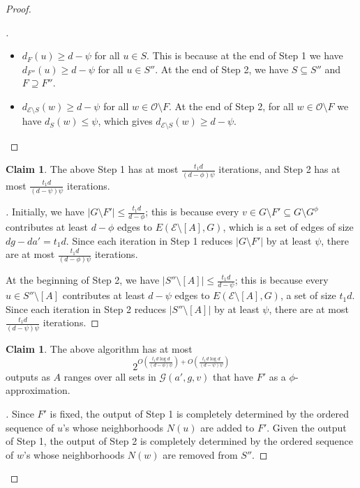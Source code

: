 \documentclass{amsart}
\newenvironment{subproof}[1][\proofname]{
  \renewcommand{\qedsymbol}{$\blacksquare$}
  \begin{proof}[#1]
}{
  \end{proof}
}
\theoremstyle{definition}
\newtheorem{claim}[thm]{Claim}
\newcommand{\cO}{\mathcal{O} }
\newcommand{\cE}{\mathcal{E} }
\newcommand{\cG}{\mathcal{G} }
\newcommand{\0}[0]{\emptyset}
\begin{document}
\begin{proof}
\begin{subproof}
\begin{itemize}
        \item $d_F(u)\geq d-\psi$ for all $u\in S$. This is because at the end of Step 1 we have $d_{F''}(u)\geq d-\psi$ for all $u\in S''$. At the end of Step 2, we have $S\subseteq S''$ and $F\supseteq F''$.
        
        \item $d_{\cE\setminus S}(w)\geq d-\psi$ for all $w\in \cO\setminus F$. At the end of Step 2, for all $w\in \cO\setminus F$ we have $d_{S}(w)\leq \psi$, which gives $d_{\cE\setminus S}(w)\geq d-\psi$. \qedhere
    \end{itemize}
\end{subproof}

\begin{claim}\label{claim:psi-iterations-bound}
    The above Step 1 has at most $\frac{t_1d}{(d-\phi)\psi}$ iterations, and Step 2 has at most $\frac{t_1d}{(d-\psi)\psi}$ iterations.
\end{claim}
\begin{subproof}
    Initially, we have $|G\setminus F'|\leq \frac{t_1d}{d-\phi}$; this is because every $v\in G\setminus F'\subseteq G\setminus G^\phi$ contributes at least $d-\phi$ edges to $E(\cE\setminus [A], G)$, which is a set of edges of size $dg-da'=t_1d$. Since each iteration in Step 1 reduces $|G\setminus F'|$ by at least $\psi$, there are at most $\frac{t_1d}{(d-\phi)\psi}$ iterations.

    At the beginning of Step 2, we have $|S''\setminus [A]|\leq\frac{t_1d}{d-\psi}$; this is because every $u\in S''\setminus [A]$ contributes at least $d-\psi$ edges to $E(\cE\setminus [A], G)$, a set of size $t_1d$. Since each iteration in Step 2 reduces $|S''\setminus [A]|$ by at least $\psi$, there are at most $\frac{t_1d}{(d-\psi)\psi}$ iterations.
\end{subproof}

\begin{claim}\label{claim:psi-2}
    The above algorithm has at most 
    \[
    2^{O\left(\frac{t_1d\log d}{(d-\phi)\psi}\right)+O\left(\frac{t_1d\log d}{(d-\psi)\psi}\right)}
    \]
    outputs as $A$ ranges over all sets in $\cG(a',g,v)$ that have $F'$ as a $\phi$-approximation.
\end{claim}
\begin{subproof}
Since $F'$ is fixed, the output of Step 1 is completely determined by the ordered sequence of $u$'s whose neighborhoods $N(u)$ are added to $F'$. Given the output of Step 1, the output of Step 2 is completely determined by the ordered sequence of $w$'s whose neighborhoods $N(w)$ are removed from $S''$.


\end{subproof}
\end{proof}
\end{document}

